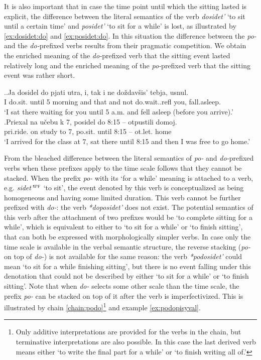 It is also important that in case the time point until which the sitting lasted is explicit, the difference between the literal semantics of the verb \textit{dosidet'} `to sit until a certain time' and \textit{posidet'} `to sit for a while' is lost, as illustrated by \ref{ex:dosidet:do} and \ref{ex:posidet:do}. In this situation the difference between the \textit{po-} and the \textit{do-}prefixed verbs results from their pragmatic competition. We obtain the enriched meaning of the \textit{do-}prefixed verb that the sitting event lasted relatively long and the enriched meaning of the \textit{po-}prefixed verb that the sitting event was rather short. 

\ex.\ag.\label{ex:dosidet:do}Ja dosidel do pjati utra, i, tak i ne do\v{z}dav\v{s}is' tebja, usnul.\\
I do.sit. until 5 morning and that and not do.wait..refl you, fall.asleep.\\
\trans `I sat there waiting for you until 5 a.m. and fell asleep (before you arrive).'\\
\bg.\label{ex:posidet:do}Priexal na u\v{c}ebu k 7, posidel do 8:15 -- otpustili domoj.\\
pri.ride. on study to 7, po.sit. until 8:15 -- ot.let. home\\
\trans `I arrived for the class at 7, sat there until 8:15 and then I was free to go home.'

From the bleached difference between the literal semantics of \textit{po-} and \textit{do-}prefixed verbs when these prefixes apply to the time scale follows that they cannot be stacked. When the prefix \textit{po-} with its `for a while' meaning is attached to a verb, e.g. \textit{sidet'}$^{\textsc{ipf}}$ `to sit', the event denoted by this verb is conceptualized as being homogeneous and having some limited duration. This verb cannot be further prefixed with \textit{do-}: the verb \textit{*doposidet'} does not exist. The potential semantics of this verb after the attachment of two prefixes would be `to complete sitting for a while', which is equivalent to either to `to sit for a while' or `to finish sitting', that can both be expressed with morphologically simpler verbs. In case only the time scale is available in the verbal semantic structure, the reverse stacking (\textit{po-} on top of \textit{do-}) is not available for the same reason: the verb \textit{*podosidet'} could mean `to sit for a while finishing sitting', but there is no event falling under this denotation that could not be described by either `to sit for a while' or `to finish sitting'. Note that when \textit{do-} selects some other scale than the time scale, the prefix \textit{po-} can be stacked on top of it after the verb is imperfectivized. This is illustrated by chain \ref{chain:podo}\footnote{Only additive interpretations are provided for the verbs in the chain, but terminative interpretations are also possible. In this case the last derived verb means either `to write the final part for a while' or `to finish writing all of.'} and example \ref{ex:podopisyval}.


